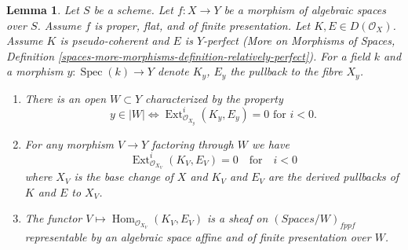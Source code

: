 \documentclass{stacks-project}
\theoremstyle{plain}
\newtheorem{lemma}[subsection]{Lemma}
\theoremstyle{definition}
\theoremstyle{remark}
\numberwithin{equation}{subsection}
\def\Spec{\mathop{\mathrm{Spec}}}
\def\Hom{\mathop{\mathrm{Hom}}\nolimits}
\def\Ext{\mathop{\mathrm{Ext}}\nolimits}
\begin{document}
\begin{lemma}
\label{lemma-complexes-open-neg-exts-vanishing}
Let $S$ be a scheme.
Let $f : X \to Y$ be a morphism of algebraic spaces over $S$.
Assume $f$ is proper, flat, and of finite presentation.
Let $K, E \in D(\mathcal{O}_X)$. Assume $K$ is pseudo-coherent
and $E$ is $Y$-perfect (More on Morphisms of Spaces, Definition
\ref{spaces-more-morphisms-definition-relatively-perfect}).
For a field $k$ and a morphism $y : \Spec(k) \to Y$ denote $K_y$, $E_y$
the pullback to the fibre $X_y$.
\begin{enumerate}
\item There is an open $W \subset Y$ characterized by the property
$$
y \in |W|
\Leftrightarrow
\Ext^i_{\mathcal{O}_{X_y}}(K_y, E_y) = 0
\text{ for }i < 0.
$$
\item For any morphism $V \to Y$ factoring through $W$ we have
$$
\Ext^i_{\mathcal{O}_{X_V}}(K_V, E_V) = 0
\quad\text{for}\quad i < 0
$$
where $X_V$ is the base change of $X$ and $K_V$ and $E_V$
are the derived pullbacks of $K$ and $E$ to $X_V$.
\item The functor $V \mapsto \Hom_{\mathcal{O}_{X_V}}(K_V, E_V)$
is a sheaf on $(\textit{Spaces}/W)_{fppf}$ representable by an
algebraic space affine and of finite presentation over $W$.
\end{enumerate}
\end{lemma}
\end{document}
